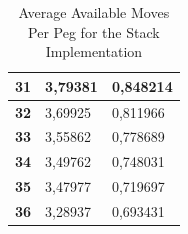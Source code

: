 \documentclass[a4paper]{article}
\begin{document}
\begin{table}[]
\begin{tabular}{|l|l|l|}
\textbf{31}     & 3,79381                                      & 0,848214                                         \\ \hline
\textbf{32}     & 3,69925                                      & 0,811966                                         \\ \hline
\textbf{33}     & 3,55862                                      & 0,778689                                         \\ \hline
\textbf{34}     & 3,49762                                      & 0,748031                                         \\ \hline
\textbf{35}     & 3,47977                                      & 0,719697                                         \\ \hline
\textbf{36}     & 3,28937                                      & 0,693431                                         \\ \hline
\end{tabular}
\caption{Average Available Moves Per Peg for the Stack Implementation}
\end{table}
\end{document}
